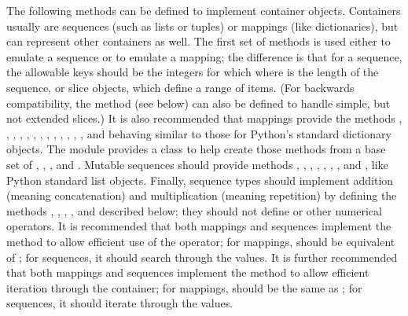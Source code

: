 The following methods can be defined to implement container
objects.  Containers usually are sequences (such as lists or tuples)
or mappings (like dictionaries), but can represent other containers as
well.  The first set of methods is used either to emulate a
sequence or to emulate a mapping; the difference is that for a
sequence, the allowable keys should be the integers  for which
 where  is the length of the
sequence, or slice objects, which define a range of items. (For backwards
compatibility, the method  (see below) can also be
defined to handle simple, but not extended slices.) It is also recommended
that mappings provide the methods , ,
, , , ,
, , ,
, , ,		     
, and  behaving similar to those for
Python's standard dictionary objects.  The  module
provides a  class to help create those methods
from a base set of , ,
, and .		     
Mutable sequences should provide
methods , , ,
,		     
, , , 
and , like Python standard list objects.  Finally,
sequence types should implement addition (meaning concatenation) and
multiplication (meaning repetition) by defining the methods
, , ,
,  and  described
below; they should not define  or other numerical
operators.  It is recommended that both mappings and sequences
implement the  method to allow efficient use of
the  operator; for mappings,  should be equivalent
of ; for sequences, it should search through the
values.  It is further recommended that both mappings and sequences
implement the  method to allow efficient iteration
through the container; for mappings,  should be
the same as ; for sequences, it should iterate
through the values.

